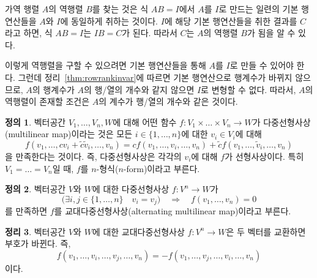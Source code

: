\documentclass[unfonts,oneside,a4paper]{oblivoir}
\theoremstyle{definition}
\newtheorem{definition}{정의}[section]
\theoremstyle{theorem}
\newtheorem{theorem}[definition]{정리}
\theoremstyle{theorem}
\theoremstyle{remark}
\theoremstyle{remark}
\theoremstyle{remark}
\theoremstyle{remark}
\renewcommand{\vec}[1]{\bm{\mathit{#1}}}
\begin{document}
가역 행렬 $A$의 역행렬 $B$를 찾는 것은 식 $AB = I$에서 $A$를 $I$로 만드는 일련의 기본 행연산들을 $A$와 $I$에 동일하게 취하는 것이다.
$I$에 해당 기본 행연산들을 취한 결과를 $C$라고 하면, 식 $AB = I$는 $IB = C$가 된다.
따라서 $C$는 $A$의 역행렬 $B$가 됨을 알 수 있다.

이렇게 역행렬을 구할 수 있으려면 기본 행연산들을 통해 $A$를 $I$로 만들 수 있어야 한다.
그런데 정리~\ref{thm:rowrankinvar}에 따르면 기본 행연산으로 행계수가 바뀌지 않으므로, $A$의 행계수가 $A$의 행/열의 개수와 같지 않으면 $I$로 변형할 수 없다.
따라서, $A$의 역행렬이 존재할 조건은 $A$의 계수가 행/열의 개수와 같은 것이다.

\begin{definition} \label{def:multilin}
    벡터공간 $V_1, \dots, V_n, W$에 대해 어떤 함수 $f: V_1 \times \dots \times V_n \rightarrow W$가 다중선형사상(multilinear map)이라는 것은 모든 $i \in \{1, \dots, n\}$에 대한 $\vec v_i \in V_i$에 대해
    \begin{equation*}
        f(\vec v_1, \dots, c \vec v_i + \tilde c \tilde{\vec v}_i, \dots, \vec v_n) = c f(\vec v_1, \dots, \vec v_i, \dots, \vec v_n) + \tilde c f(\vec v_1, \dots, \tilde{\vec v}_i, \dots, \vec v_n)
    \end{equation*}
    을 만족한다는 것이다.
    즉, 다중선형사상은 각각의 $\vec v_i$에 대해 $f$가 선형사상이다.
    특히 $V_1 = \dots = V_n$일 때, $f$를 $n$-형식($n$-form)이라고 부른다.
\end{definition}

\begin{definition} \label{def:alternating_multilin}
    벡터공간 $V$와 $W$에 대한 다중선형사상 $f: V^n \rightarrow W$가
    \begin{equation*}
        \bigl(\exists i, j \in \{1, \dots, n\} \quad \vec v_i = \vec v_j\bigr) \quad \Rightarrow \quad f(\vec v_1, \dots, \vec v_n) = 0
    \end{equation*}
    를 만족하면 $f$를 교대다중선형사상(alternating multilinear map)이라고 부른다.
\end{definition}

\begin{theorem} \label{thm:skew_sym}
    벡터공간 $V$와 $W$에 대한 교대다중선형사상 $f: V^n \rightarrow W$은 두 벡터를 교환하면 부호가 바뀐다.
    즉,
    \begin{equation*}
        f(\vec v_1, \dots, \vec v_i, \dots, \vec v_j, \dots, \vec v_n) = -f(\vec v_1, \dots, \vec v_j, \dots, \vec v_i, \dots, \vec v_n)
    \end{equation*}
    이다.
\end{theorem}
\end{document}
